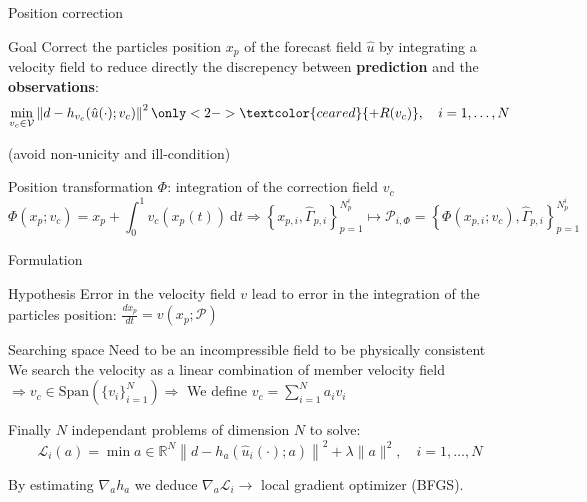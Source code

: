\documentclass[aspectratio=169]{beamer} %
\begin{document}
\begin{frame}{Position correction}
    \begin{block}{Goal}
        Correct the particles position $x_p$ of the forecast field $\hat u$ by integrating a velocity field to reduce directly the discrepency between \textbf{prediction} and the \textbf{observations}:
        \begin{equation*}
            \min_{v_c \in \mathcal V} \left\|d - h_{v_c}(\hat u(\cdot); v_c) \right\|^2 \only<2->{\textcolor{ceared}{+ R(v_c)}}, \quad i = 1, \dots, N
        \end{equation*}
    \end{block}
     (avoid non-unicity and ill-condition)

    \begin{block}{Position transformation $\Phi$: integration of the correction field $v_c$}
        \begin{equation*}
            \Phi(x_p; v_c) = x_p + \int_{0}^{1} v_c(x_p(t))~\mathrm{d}t \Rightarrow \left\{x_{p,i}, \hat \Gamma_{p,i}\right\}_{p=1}^{N^i_p} \mapsto \mathcal{P}_{i, \Phi} = \left\{\Phi(x_{p,i}; v_c), \hat \Gamma_{p,i}\right\}_{p=1}^{N^i_p}
        \end{equation*}
    \end{block}
\end{frame}

\begin{frame}{Formulation}

    \begin{block}{Hypothesis}
        Error in the velocity field $v$ lead to error in the integration of the particles position: $\frac{d x_p}{d t} = v(x_p; \mathcal P)$
    \end{block}

    \begin{block}{Searching space}
        Need to be an incompressible field to be physically consistent \\
        We search the velocity as a linear combination of member velocity field  \\
        $\Rightarrow v_c \in \mathrm{Span}(\{v_i\}_{i=1}^{N}) \Rightarrow$ We define $v_c = \sum_{i=1}^N a_i v_i$
    \end{block}

    Finally $N$ independant problems of dimension $N$ to solve:  \\

    \begin{equation*}
        \mathcal L_i (a) = \min{a \in \mathbb{R}^N} \left\|d - h_a(\hat u_i(\cdot); a) \right\|^2 + \lambda \|a\|^2, \quad i = 1, \dots, N
    \end{equation*}

    By estimating $\nabla_a h_a$ we deduce $\nabla_a \mathcal L_i \rightarrow$ local gradient optimizer (BFGS).
\end{frame}
\end{document}
